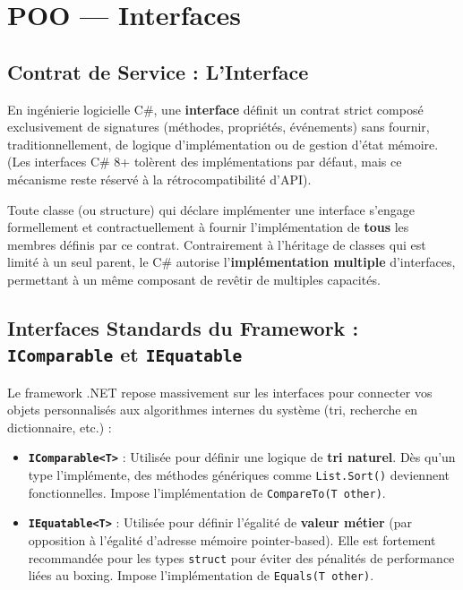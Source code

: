 \section{POO — Interfaces}

\subsection{Contrat de Service : L'Interface}

En ingénierie logicielle C\#, une \textbf{interface} définit un contrat strict composé exclusivement de signatures (méthodes, propriétés, événements) sans fournir, traditionnellement, de logique d'implémentation ou de gestion d'état mémoire. (Les interfaces C\# 8+ tolèrent des implémentations par défaut, mais ce mécanisme reste réservé à la rétrocompatibilité d'API).

Toute classe (ou structure) qui déclare implémenter une interface s'engage formellement et contractuellement à fournir l'implémentation de \textbf{tous} les membres définis par ce contrat. Contrairement à l'héritage de classes qui est limité à un seul parent, le C\# autorise l'\textbf{implémentation multiple} d'interfaces, permettant à un même composant de revêtir de multiples capacités.

\subsection{Interfaces Standards du Framework : \texttt{IComparable} et \texttt{IEquatable}}

Le framework .NET repose massivement sur les interfaces pour connecter vos objets personnalisés aux algorithmes internes du système (tri, recherche en dictionnaire, etc.) :
\begin{itemize}
    \item \textbf{\texttt{IComparable<T>}} : Utilisée pour définir une logique de \textbf{tri naturel}. Dès qu'un type l'implémente, des méthodes génériques comme \texttt{List.Sort()} deviennent fonctionnelles. Impose l'implémentation de \texttt{CompareTo(T other)}.
    \item \textbf{\texttt{IEquatable<T>}} : Utilisée pour définir l'égalité de \textbf{valeur métier} (par opposition à l'égalité d'adresse mémoire pointer-based). Elle est fortement recommandée pour les types \texttt{struct} pour éviter des pénalités de performance liées au boxing. Impose l'implémentation de \texttt{Equals(T other)}.
\end{itemize}


